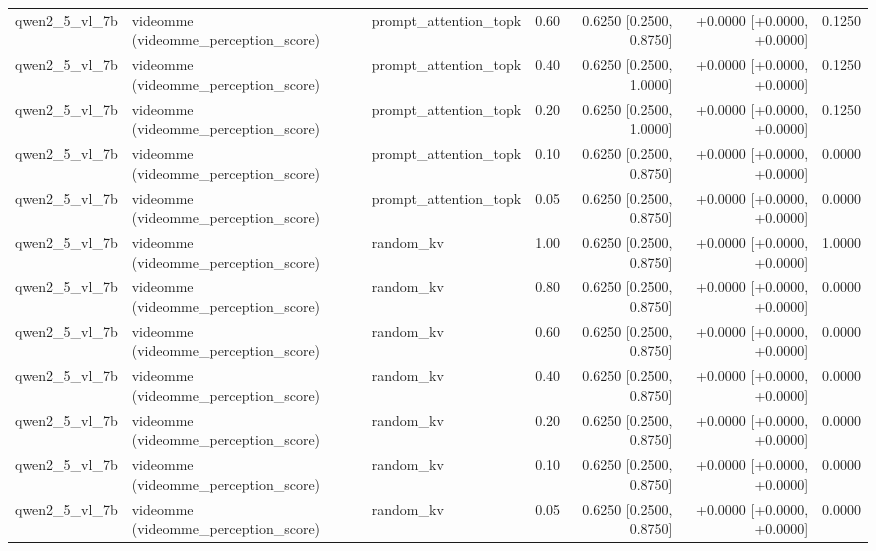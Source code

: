 \begin{longtable}{lllrrrr}
qwen2\_5\_vl\_7b & videomme (videomme\_perception\_score) & prompt\_attention\_topk & 0.60 & 0.6250 [0.2500, 0.8750] & +0.0000 [+0.0000, +0.0000] & 0.1250 \\
qwen2\_5\_vl\_7b & videomme (videomme\_perception\_score) & prompt\_attention\_topk & 0.40 & 0.6250 [0.2500, 1.0000] & +0.0000 [+0.0000, +0.0000] & 0.1250 \\
qwen2\_5\_vl\_7b & videomme (videomme\_perception\_score) & prompt\_attention\_topk & 0.20 & 0.6250 [0.2500, 1.0000] & +0.0000 [+0.0000, +0.0000] & 0.1250 \\
qwen2\_5\_vl\_7b & videomme (videomme\_perception\_score) & prompt\_attention\_topk & 0.10 & 0.6250 [0.2500, 0.8750] & +0.0000 [+0.0000, +0.0000] & 0.0000 \\
qwen2\_5\_vl\_7b & videomme (videomme\_perception\_score) & prompt\_attention\_topk & 0.05 & 0.6250 [0.2500, 0.8750] & +0.0000 [+0.0000, +0.0000] & 0.0000 \\
qwen2\_5\_vl\_7b & videomme (videomme\_perception\_score) & random\_kv & 1.00 & 0.6250 [0.2500, 0.8750] & +0.0000 [+0.0000, +0.0000] & 1.0000 \\
qwen2\_5\_vl\_7b & videomme (videomme\_perception\_score) & random\_kv & 0.80 & 0.6250 [0.2500, 0.8750] & +0.0000 [+0.0000, +0.0000] & 0.0000 \\
qwen2\_5\_vl\_7b & videomme (videomme\_perception\_score) & random\_kv & 0.60 & 0.6250 [0.2500, 0.8750] & +0.0000 [+0.0000, +0.0000] & 0.0000 \\
qwen2\_5\_vl\_7b & videomme (videomme\_perception\_score) & random\_kv & 0.40 & 0.6250 [0.2500, 0.8750] & +0.0000 [+0.0000, +0.0000] & 0.0000 \\
qwen2\_5\_vl\_7b & videomme (videomme\_perception\_score) & random\_kv & 0.20 & 0.6250 [0.2500, 0.8750] & +0.0000 [+0.0000, +0.0000] & 0.0000 \\
qwen2\_5\_vl\_7b & videomme (videomme\_perception\_score) & random\_kv & 0.10 & 0.6250 [0.2500, 0.8750] & +0.0000 [+0.0000, +0.0000] & 0.0000 \\
qwen2\_5\_vl\_7b & videomme (videomme\_perception\_score) & random\_kv & 0.05 & 0.6250 [0.2500, 0.8750] & +0.0000 [+0.0000, +0.0000] & 0.0000 \\
\end{longtable}
